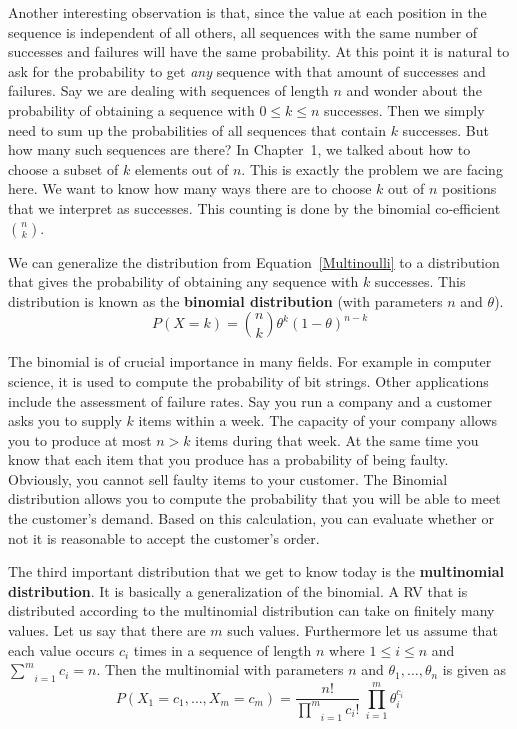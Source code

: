 Another interesting observation is that, since the value at each position in the sequence is independent of all others, all sequences with the same
number of successes and failures will have the same probability. At this point it is natural to ask for the probability to get \textit{any}
sequence with that amount of successes and failures. Say we are dealing with sequences of length $ n $ and wonder about the probability of 
obtaining a sequence with $ 0 \leq k \leq n $ successes. Then we simply need to sum up the probabilities of all sequences that contain $ k $ 
successes. But how many such sequences are there? In Chapter~1, we talked about how to choose a subset of $ k $ elements
out of $ n $. This is exactly the problem we are facing here. We want to know how many ways there are to choose $ k $ out of $ n $ positions
that we interpret as successes. This counting is done by the binomial co-efficient $ \binom{n}{k} $.

We can generalize the distribution from Equation~\eqref{Multinoulli} to a distribution that gives the probability of obtaining any sequence
with $ k $ successes. This distribution is known as the \textbf{binomial distribution} (with parameters $ n $ and $ \theta $).
\begin{equation}
P(X=k) = \binom{n}{k} \theta^{k} (1-\theta)^{n-k}
\end{equation}

The binomial is of crucial importance in many fields. For example in computer science, it is used to compute the probability of bit strings.
Other applications include the assessment of failure rates. Say you run a company and a customer asks you to supply $ k $ items within a week.
The capacity of your company allows you to produce at most $ n > k $ items during that week. At the same time you know that each item that you 
produce has a probability of being faulty. Obviously, you cannot sell faulty items to your customer. The Binomial distribution allows you to
compute the probability that you will be able to meet the customer's demand. Based on this calculation, you can evaluate whether or not it is reasonable to
accept the customer's order.

The third important distribution that we get to know today is the \textbf{multinomial distribution}. It is basically a generalization
of the binomial. A RV that is distributed according to the multinomial distribution can take on finitely many values. Let us say that
there are $ m $ such values. Furthermore let us assume that each value occurs $ c_{i} $ times in a sequence of length $ n $ where
$ 1 \leq i \leq n $ and $ \underset{i=1}{\overset{m}{\sum}}c_{i} = n $. Then the multinomial with parameters $ n $ and 
$ \theta_{1}, \ldots, \theta_{n} $ is given as 
\begin{equation}
P(X_{1}=c_{1}, \ldots, X_{m}=c_{m}) = \dfrac{n!}{\underset{i=1}{\overset{m}{\prod}}c_{i}!}~\underset{i=1}{\overset{m}{\prod}} \theta_{i}^{c_{i}}
\end{equation}

